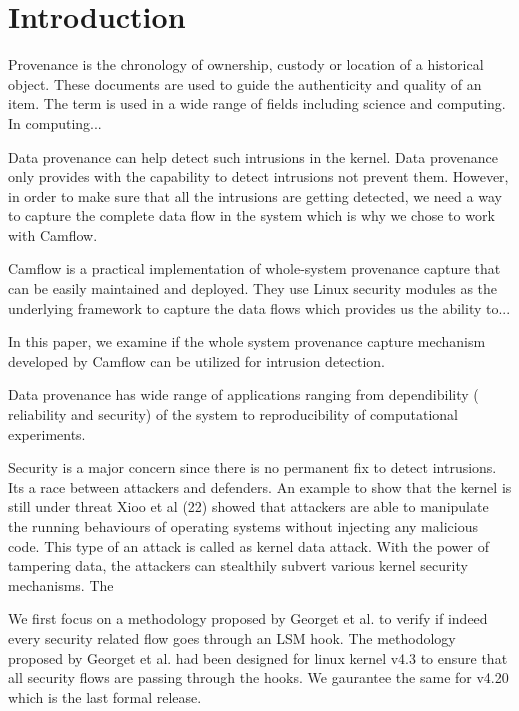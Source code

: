 \section{Introduction}
\label{What is provenance im general and with respect to computing?}

Provenance is the chronology of ownership, custody or location of a historical object. These documents are used to guide the authenticity and quality of an item. The term is used in a wide range of fields including science and computing. In computing...
\vskip 0.1in



Data provenance can help detect such intrusions in the kernel. Data provenance only provides with the capability to detect intrusions not prevent them. However, in order to make sure that all the intrusions are getting detected, we need a way to capture the complete data flow in the system which is why we chose to work with Camflow. 
\vskip 0.1in
\label{Camflow and whole system provenance and LSMs}

Camflow is a practical implementation of whole-system provenance capture that can be easily maintained and deployed. They use Linux security modules as the underlying framework to capture the data flows which provides us the ability to...


\label{What are we doing?}
In this paper, we examine if the whole system provenance capture mechanism developed by Camflow can be utilized for intrusion detection. 

\vskip 0.1in
\label{Applications of data provenance}

Data provenance has wide range of applications ranging from dependibility ( reliability and security) of the system to reproducibility of computational experiments.
\vskip 0.1in
\label{Role of data povenance in security}

Security is a major concern since there is no permanent fix to detect intrusions. Its a race between attackers and defenders.
An example to show that the kernel is still under threat Xioo et al (22) showed that attackers are able to manipulate the running behaviours of operating systems without injecting any malicious code. This type of an attack is called as kernel data attack. With the power of tampering data, the attackers can stealthily subvert various kernel security mechanisms. The 
\vskip 0.1in
\label{Challenge 1}

We first focus on a methodology proposed by Georget et al. to verify if indeed every security related flow goes through an LSM hook. The methodology proposed by Georget et al. had been designed for linux kernel v4.3 to ensure that all security flows are passing through the hooks. We gaurantee the same for v4.20 which is the last formal release. 
\vskip 0.1in
\label{Challenge 2}

